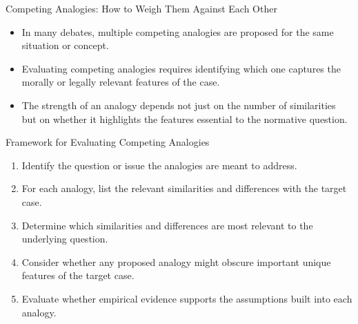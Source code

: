 \documentclass{beamer}
\begin{document}
\begin{frame}{Competing Analogies: How to Weigh Them Against Each Other}
	\begin{itemize}
		\item In many debates, multiple competing analogies are proposed for the same situation or concept.
		\item Evaluating competing analogies requires identifying which one captures the morally or legally relevant features of the case.
		\item The strength of an analogy depends not just on the number of similarities but on whether it highlights the features essential to the normative question.
	\end{itemize}
	
	\begin{block}{Framework for Evaluating Competing Analogies}
		\scriptsize
		\begin{enumerate}
			\item Identify the question or issue the analogies are meant to address.
			\item For each analogy, list the relevant similarities and differences with the target case.
			\item Determine which similarities and differences are most relevant to the underlying question.
			\item Consider whether any proposed analogy might obscure important unique features of the target case.
			\item Evaluate whether empirical evidence supports the assumptions built into each analogy.
		\end{enumerate}
	\end{block}
\end{frame}
\end{document}
